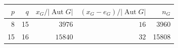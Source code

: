 \begin{center}\begin{tabular}{rrrrr}\toprule
$p$&$q$&$x_G/|\operatorname{Aut}G|$&$(x_G-e_G)/|\operatorname{Aut}G|$&$n_G$\\\midrule
8 & 15 & $3976$ & $16$ & 3960\\
15 & 16 & $15840$ & $32$ & 15808\\
\bottomrule\end{tabular}\end{center}

